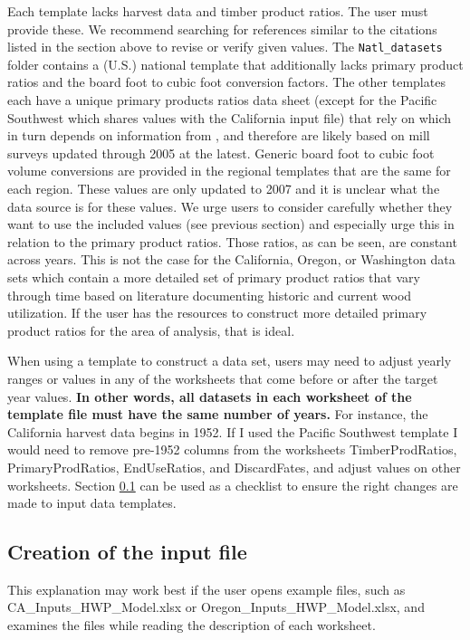 \documentclass[
  openany]{book}
\begin{document}
Each template lacks harvest data and timber product ratios. The user must provide these. We recommend searching for references similar to the citations listed in the section above to revise or verify given values. The \texttt{Natl\_datasets} folder contains a (U.S.) national template that additionally lacks primary product ratios and the board foot to cubic foot conversion factors. The other templates each have a unique primary products ratios data sheet (except for the Pacific Southwest which shares values with the California input file) that rely on \textcite{smith2006} which in turn depends on information from \textcite{adams2006}, and therefore are likely based on mill surveys updated through 2005 at the latest. Generic board foot to cubic foot volume conversions are provided in the regional templates that are the same for each region. These values are only updated to 2007 and it is unclear what the data source is for these values. We urge users to consider carefully whether they want to use the included values (see previous section) and especially urge this in relation to the primary product ratios. Those ratios, as can be seen, are constant across years. This is not the case for the California, Oregon, or Washington data sets which contain a more detailed set of primary product ratios that vary through time based on literature documenting historic and current wood utilization. If the user has the resources to construct more detailed primary product ratios for the area of analysis, that is ideal.

When using a template to construct a data set, users may need to adjust yearly ranges or values in any of the worksheets that come before or after the target year values. \textbf{In other words, all datasets in each worksheet of the template file must have the same number of years.} For instance, the California harvest data begins in 1952. If I used the Pacific Southwest template I would need to remove pre-1952 columns from the worksheets TimberProdRatios, PrimaryProdRatios, EndUseRatios, and DiscardFates, and adjust values on other worksheets. Section \ref{own-prov-input} can be used as a checklist to ensure the right changes are made to input data templates.

\hypertarget{own-prov-input}{%
\subsection{Creation of the input file}\label{own-prov-input}}

This explanation may work best if the user opens example files, such as CA\_Inputs\_HWP\_Model.xlsx or Oregon\_Inputs\_HWP\_Model.xlsx, and examines the files while reading the description of each worksheet.
\end{document}
